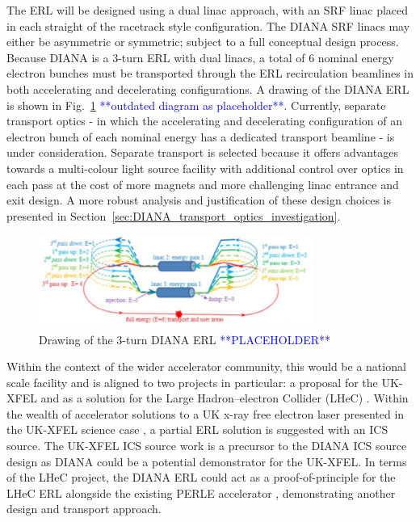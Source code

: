 \documentclass[../main.tex]{subfiles}
\begin{document}
The ERL will be designed using a dual linac approach, with an SRF linac placed in each straight of the racetrack style configuration. The DIANA SRF linacs may either be asymmetric or symmetric; subject to a full conceptual design process. Because DIANA is a 3-turn ERL with dual linacs, a total of 6 nominal energy electron bunches must be transported through the ERL recirculation beamlines in both accelerating and decelerating configurations. A drawing of the DIANA ERL is shown in Fig.~\ref{fig:DIANA_ERL_diagram} \textcolor{blue}{**outdated diagram as placeholder**}. Currently, separate transport optics - in which the accelerating and decelerating configuration  of an electron bunch of each nominal energy has a dedicated transport beamline - is under consideration. Separate transport is selected because it offers advantages towards a multi-colour light source facility with additional control over optics in each pass at the cost of more magnets and more challenging linac entrance and exit design. A more robust analysis and justification of these design choices is presented in Section~\ref{sec:DIANA_transport_optics_investigation}. 
\begin{figure}[!h]
\centering
\includegraphics[width=0.8\textwidth]{Figures/DIANA_Inverse_Compton_Source_Design/DIANA_diagram_placeholder.pdf}
\caption{Drawing of the 3-turn DIANA ERL \textcolor{blue}{**PLACEHOLDER**}}
\label{fig:DIANA_ERL_diagram}
\end{figure}
Within the context of the wider accelerator community, this would be a national scale facility and is aligned to two projects in particular: a proposal for the UK-XFEL \cite{burnett2020uk} and as a solution for the Large Hadron--electron Collider (LHeC) \cite{valloni2013strawman,bruning2019exploring,holzer2021accelerator}. Within the wealth of accelerator solutions to a UK x-ray free electron laser presented in the UK-XFEL science case \cite{burnett2020uk}, a partial ERL solution is suggested with an ICS source. The UK-XFEL ICS source work is a precursor to the DIANA ICS source design as DIANA could be a potential demonstrator for the UK-XFEL. In terms of the LHeC project, the DIANA ERL could act as a proof-of-principle for the LHeC ERL alongside the existing PERLE accelerator \cite{angal2018perle}, demonstrating another design and transport approach.
\end{document}
